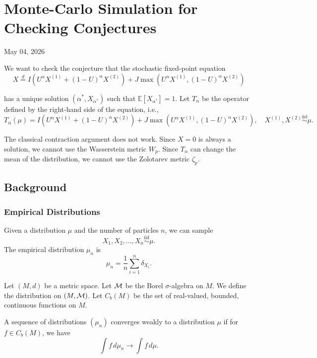 \chapter{Monte-Carlo Simulation for Checking Conjectures}
\begin{center}
  May 04, 2026
  \vspace{0.5cm}
\end{center}

We want to check the conjecture that the stochastic fixed-point equation
\begin{equation}
  X \stackrel{d}{=} I(U^{\alpha}X^{(1)} + (1-U)^{\alpha}X^{(2)}) + J\max(U^{\alpha}X^{(1)}, (1-U)^{\alpha}X^{(2)})
\end{equation}

has a unique solution $(\alpha^*, X_{\alpha^*})$ such that $\mathbb{E}[X_{\alpha^*}] = 1$. Let $T_\alpha$ be the operator defined by the right-hand side of the equation, i.e.,
\begin{equation}
  T_\alpha(\mu) = I(U^{\alpha}X^{(1)} + (1-U)^{\alpha}X^{(2)}) + J\max(U^{\alpha}X^{(1)}, (1-U)^{\alpha}X^{(2)}), \quad X^{(1)}, X^{(2)} \overset{\text{iid}}{\sim} \mu.
\end{equation}


The classical contraction argument does not work. Since $X=0$ is always a solution, we cannot use the Wasserstein metric $W_p$. Since $T_\alpha$ can change the mean of the distribution, we cannot use the Zolotarev metric $\zeta_p$.

\section{Background}
\subsection{Empirical Distributions}

Given a distribution $\mu$ and the number of particles $n$, we can sample
$$X_1, X_2, \ldots, X_n \overset{\text{iid}}{\sim} \mu.$$
The empirical distribution $\mu_n$ is
$$\mu_n = \frac{1}{n} \sum_{i=1}^n \delta_{X_i}.$$

\begin{definition}
  Let $(M,d)$ be a metric space. Let $\mathcal{M}$ be the Borel $\sigma$-algebra on $M$. We define the distribution on $(M, \mathcal{M})$. Let $C_b(M)$ be the set of real-valued, bounded, continuous functions on $M$.

  A sequence of distributions $(\mu_n)$ converges weakly to a distribution $\mu$ if for $f\in C_b(M)$, we have
  $$\int f \, d\mu_n \to \int f \, d\mu.$$
\end{definition}

